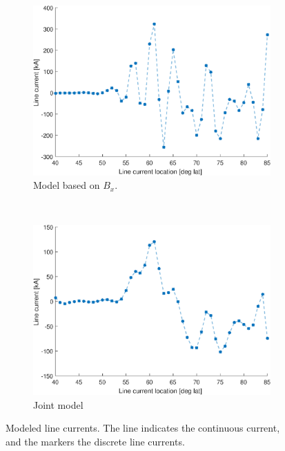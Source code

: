 \begin{figure}[ht]
    ~ %
    \begin{subfigure}[b]{0.45\textwidth}
        \includegraphics[width=\textwidth]{fig/LCx.eps}
        \caption{Model based on $B_x$.}
        \label{fig:LCx}
    \end{subfigure}
    ~ %
    \begin{subfigure}[b]{0.45\textwidth}
        \includegraphics[width=\textwidth]{fig/LCj.eps}
        \caption{Joint model}
        \label{fig:LCj}
    \end{subfigure}
    \caption{Modeled line currents. The line indicates the continuous current, and the markers the discrete line currents.}
    \label{fig:LC}
\end{figure}